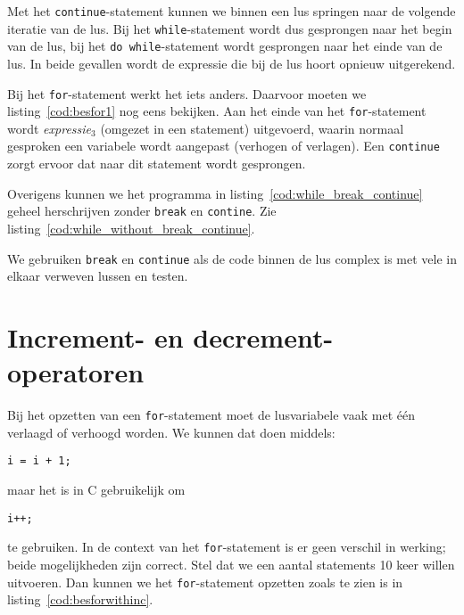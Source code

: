 Met het \texttt{continue}-statement kunnen we binnen een lus springen naar de volgende iteratie van de lus. Bij het \texttt{while}-statement wordt dus gesprongen naar het begin van de lus, bij het \texttt{do while}-statement wordt gesprongen naar het einde van de lus. In beide gevallen wordt de expressie die bij de lus hoort opnieuw uitgerekend.

Bij het \texttt{for}-statement werkt het iets anders. Daarvoor moeten we listing~\ref{cod:besfor1} nog eens bekijken. Aan het einde van het \texttt{for}-statement wordt \textsl{expressie$_3$} (omgezet in een statement) uitgevoerd, waarin normaal gesproken een variabele wordt aangepast (verhogen of verlagen). Een \texttt{continue} zorgt ervoor dat naar dit statement wordt gesprongen.


Overigens kunnen we het programma in listing~\ref{cod:while_break_continue} geheel herschrijven zonder \texttt{break} en \texttt{contine}. Zie listing~\ref{cod:while_without_break_continue}.


We gebruiken \texttt{break} en \texttt{continue} als de code binnen de lus complex is met vele in elkaar verweven lussen en testen.


\section{Increment- en decrement-operatoren}
Bij het opzetten van een \texttt{for}-statement moet de lusvariabele vaak met één verlaagd of verhoogd worden. We kunnen dat doen middels:

\hspace*{1em}\texttt{i = i + 1;}

maar het is in C gebruikelijk om

\hspace*{1em}\texttt{i++;}

te gebruiken. In de context van het \texttt{for}-statement is er geen verschil in werking; beide mogelijkheden zijn correct. Stel dat we een aantal statements 10 keer willen uitvoeren. Dan kunnen we het \texttt{for}-statement opzetten zoals te zien is in listing~\ref{cod:besforwithinc}.

